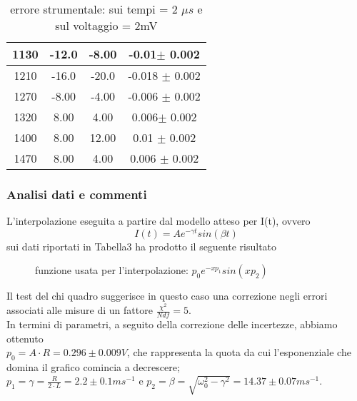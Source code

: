 \documentclass[a4paper]{article}
\theoremstyle{definition}
\begin{document}
\begin{table}[!htbp]
{\begin{tabular}{c|cc|c}
        \hline
        1130& -12.0& -8.00&  -0.01\(\pm\)   0.002\\
        \hline
        1210& -16.0& -20.0&  -0.018 \(\pm\)  0.002\\
        \hline
        1270& -8.00& -4.00& -0.006  \(\pm\) 0.002\\
        \hline
        1320& 8.00&4.00& 0.006\(\pm\)   0.002\\
        \hline
        1400& 8.00& 12.00& 0.01 \(\pm\)  0.002\\
        \hline
        1470& 8.00& 4.00&0.006 \(\pm\)  0.002\\
        \hline
    \end{tabular}
    }
\caption{errore strumentale: sui tempi = 2 \(\mu s\) e sul voltaggio = 2mV}
\end{table}


\subsubsection*{Analisi dati e commenti}
L'interpolazione eseguita a partire dal modello atteso per I(t), ovvero
\[I(t) = Ae^{-\gamma t}sin(\beta t)\]
sui dati riportati in Tabella3 ha prodotto il seguente risultato \\

\begin{figure}[!ht]

	\caption{funzione usata per l'interpolazione:  \(p_{0}e^{- x p_{1}}sin(xp_{2}) \) }

    \label{fig:sottosmorzamento}

\end{figure}
\noindent Il test del chi quadro suggerisce in questo caso una correzione negli errori associati alle misure di un fattore \(\frac{\chi^{2}}{Ndf} = 5\). \\

\noindent In termini di parametri, a seguito della correzione delle incertezze, abbiamo ottenuto \\

\( p_{0} = A \cdot R =  0.296  \pm 0.009  V \), che rappresenta la quota da cui l'esponenziale che domina il grafico comincia a decrescere; \\

\(p_{1} = \gamma  = \frac{R}{2\cdot L}= 2.2  \pm 0.1 ms^{-1} \) e \( p_{2} = \beta = \sqrt{\omega^{2}_{0} - \gamma^{2}} = 14.37  \pm 0.07 ms^{-1} \). \\
\end{document}
